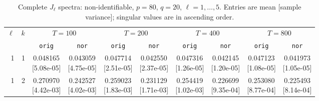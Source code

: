 \documentclass[12pt,letterpaper]{article}
\def\spacingset#1{\renewcommand{\baselinestretch}{#1}\small\normalsize}
\theoremstyle{plain}
\theoremstyle{definition}
\begin{document}
\clearpage
\begin{table}[p]
\begingroup
\spacingset{1.0}
\small\centering
\caption{Complete $J_\ell$ spectra: non-identifiable, $p=80$, $q=20$, $\ell=1,\ldots,5$. Entries are mean [sample variance]; singular values are in ascending order.}
\label{s23:lambda:alltab:spectra:p80q20exterior:1-5}
\footnotesize
\setlength{\tabcolsep}{2.2pt}
\renewcommand{\arraystretch}{1.03}
\begin{adjustbox}{max width=\linewidth}
\begin{tabular}{@{}rr*{8}{c}@{}}
\toprule
$\ell$ & $k$ & \multicolumn{2}{c}{$T=100$} & \multicolumn{2}{c}{$T=200$} & \multicolumn{2}{c}{$T=400$} & \multicolumn{2}{c}{$T=800$}\\
\cmidrule(lr){3-4}\cmidrule(lr){5-6}\cmidrule(lr){7-8}\cmidrule(lr){9-10}
 &  & \texttt{orig} & \texttt{nor} & \texttt{orig} & \texttt{nor} & \texttt{orig} & \texttt{nor} & \texttt{orig} & \texttt{nor}\\
\midrule
1 & 1 & \shortstack{0.048165\\[-1pt]{\scriptsize[5.08e-05]}} & \shortstack{0.043059\\[-1pt]{\scriptsize[4.75e-05]}} & \shortstack{0.047714\\[-1pt]{\scriptsize[2.51e-05]}} & \shortstack{0.042550\\[-1pt]{\scriptsize[2.37e-05]}} & \shortstack{0.047316\\[-1pt]{\scriptsize[1.26e-05]}} & \shortstack{0.042145\\[-1pt]{\scriptsize[1.20e-05]}} & \shortstack{0.047123\\[-1pt]{\scriptsize[1.08e-05]}} & \shortstack{0.041973\\[-1pt]{\scriptsize[1.05e-05]}}\\
1 & 2 & \shortstack{0.270970\\[-1pt]{\scriptsize[4.42e-03]}} & \shortstack{0.242527\\[-1pt]{\scriptsize[4.02e-03]}} & \shortstack{0.259023\\[-1pt]{\scriptsize[1.83e-03]}} & \shortstack{0.231129\\[-1pt]{\scriptsize[1.71e-03]}} & \shortstack{0.254419\\[-1pt]{\scriptsize[1.02e-03]}} & \shortstack{0.226699\\[-1pt]{\scriptsize[9.35e-04]}} & \shortstack{0.253080\\[-1pt]{\scriptsize[8.77e-04]}} & \shortstack{0.225493\\[-1pt]{\scriptsize[8.14e-04]}}\\

\end{tabular}
\end{adjustbox}
\end{table}
\end{document}
